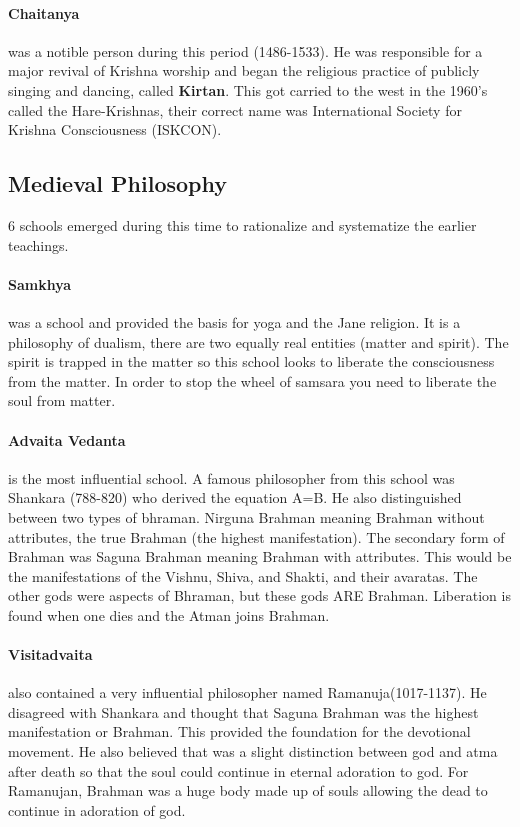 \documentclass{article}
\begin{document}
\paragraph{Chaitanya}
\label{par:chaitanya}
was a notible person during this period (1486-1533). He was responsible for a major revival of Krishna worship and began the religious practice of publicly singing and dancing, called \textbf{Kirtan}. This got carried to the west in the 1960's called the Hare-Krishnas, their correct name was International Society for Krishna Consciousness (ISKCON).

\subsection*{Medieval Philosophy}
\label{sub:medieval_philosophy}
6 schools emerged during this time to rationalize and systematize the earlier teachings.

\paragraph{Samkhya}
\label{par:samkhya}
was a school and provided the basis for yoga and the Jane religion. It is a philosophy of dualism, there are two equally real entities (matter and spirit). The spirit is trapped in the matter so this school looks to liberate the consciousness from the matter. In order to stop the wheel of samsara you need to liberate the soul from matter.

\paragraph{Advaita Vedanta}
\label{par:advaita_vedanta}
is the most influential school. A famous philosopher from this school was Shankara (788-820) who derived the equation A=B. He also distinguished between two types of bhraman. Nirguna Brahman meaning Brahman without attributes, the true Brahman (the highest manifestation). The secondary form of Brahman was Saguna Brahman meaning Brahman with attributes. This would be the manifestations of the Vishnu, Shiva, and Shakti, and their avaratas. The other gods were aspects of Bhraman, but these gods ARE Brahman. Liberation is found when one dies and the Atman joins Brahman.

\paragraph{Visitadvaita}
\label{par:visitadvaita}
also contained a very influential philosopher named Ramanuja(1017-1137). He disagreed with Shankara and thought that Saguna Brahman was the highest manifestation or Brahman. This provided the foundation for the devotional movement. He also believed that was a slight distinction between god and atma after death so that the soul could continue in eternal adoration to god. For Ramanujan, Brahman was a huge body made up of souls allowing the dead to continue in adoration of god.
\end{document}
